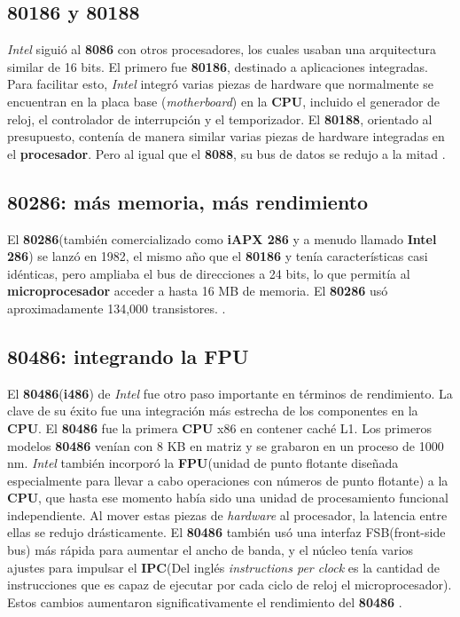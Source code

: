 \subsection{80186 y 80188}
\emph{Intel} siguió al \textbf{8086} con  otros procesadores, los cuales usaban una arquitectura similar de 16 bits. El primero fue \textbf{80186}, 
destinado a aplicaciones integradas. Para facilitar esto, \emph{Intel} integró varias piezas de hardware que normalmente se encuentran en la 
placa base (\emph{motherboard}) en la \textbf{CPU}, incluido el generador de reloj, el controlador de interrupción y el temporizador. El \textbf{80188}, 
orientado al presupuesto, contenía de manera similar varias piezas de hardware integradas en el \textbf{procesador}. Pero al igual que el \textbf{8088}, 
su bus de datos se redujo a la mitad .

\subsection{80286: más memoria, más rendimiento}
El \textbf{80286}(también comercializado como \textbf{iAPX 286} y a menudo llamado \textbf{Intel 286}) se lanzó en 1982, el mismo año que el \textbf{80186} y tenía
características casi idénticas, pero ampliaba el bus de direcciones a 24 bits, lo que permitía al \textbf{microprocesador} acceder a hasta 16 MB de memoria.
El \textbf{80286} usó aproximadamente 134,000 transistores. .

\subsection{80486: integrando la FPU}
El \textbf{80486}(\textbf{i486}) de \emph{Intel} fue otro paso importante en términos de rendimiento. La clave de su éxito fue una integración más estrecha de los componentes 
en la \textbf{CPU}. El \textbf{80486} fue la primera \textbf{CPU} x86 en contener caché L1. Los primeros modelos \textbf{80486} venían con 8 KB en matriz y se grabaron en un proceso de 1000 nm.
\emph{Intel} también incorporó la \textbf{FPU}(unidad de punto flotante diseñada especialmente para llevar a cabo operaciones con números de punto flotante) a la \textbf{CPU}, que hasta ese 
momento había sido una unidad de procesamiento funcional independiente. Al mover estas piezas de \emph{hardware} al procesador, la latencia entre ellas se redujo 
drásticamente. El \textbf{80486} también usó una interfaz FSB(front-side bus) más rápida para aumentar el ancho de banda, y el núcleo 
tenía varios ajustes para impulsar el \textbf{IPC}(Del inglés \emph{instructions per clock} es la cantidad de instrucciones que es 
capaz de ejecutar por cada ciclo de reloj el microprocesador). Estos cambios aumentaron significativamente el rendimiento del \textbf{80486} 
. 


